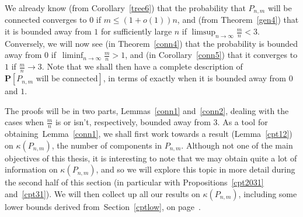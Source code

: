 \documentclass{article}
\newtheorem{Proof of Theorem}{Proof of Theorem}
\begin{document}
We already know (from Corollary~\ref{tree6}) that the probability that $P_{n,m}$ will be connected
converges to $0$ if $m \leq (1+o(1))n$,
and (from Theorem~\ref{gen4}) 
that it is bounded away from $1$ for sufficiently large $n$ if $\limsup_{n \to \infty} \frac{m}{n} < 3$.
Conversely, we will now see (in Theorem~\ref{conn4}) 
that the probability is bounded away from $0$
if~$\liminf_{n \to \infty} \frac{m}{n} >1$,
and (in Corollary~\ref{conn5}) that it converges to $1$ if $\frac{m}{n} \to 3$.
Note that we shall then have a complete description of
$\mathbf{P}[P_{n,m} \textrm{ will be connected}]$,
in terms of exactly when it is bounded away from $0$ and $1$.

The proofs will be in two parts, Lemmas~\ref{conn1} and~\ref{conn2},
dealing with the cases when $\frac{m}{n}$ is or isn't, respectively, bounded away from $3$.
As a tool for obtaining~Lemma~\ref{conn1},
we shall first work towards a result (Lemma~\ref{cpt12}) on $\kappa(P_{n,m})$,
the number of components in $P_{n,m}$.
Although not one of the main objectives of this thesis,
it is interesting to note that we may obtain quite a lot of information on $\kappa(P_{n,m})$,
and so we will explore this topic in more detail during the second half of this section
(in particular with Propositions~\ref{cpt2031} and~\ref{cpt31}).
We will then collect up all our results on $\kappa(P_{n,m})$,
including some lower bounds derived from~Section~\ref{cptlow},
on page~\pageref{cptsum}. 
\end{document}
